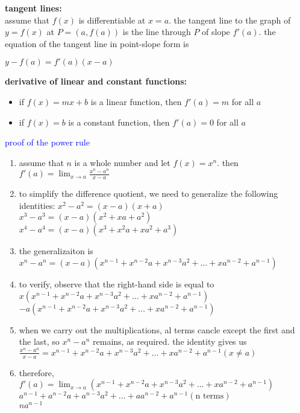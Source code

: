 \documentclass{article}
\begin{document}
\textbf{tangent lines:}\\
assume that $f(x)$ is differentiable at $x = a$. the tangent line to the graph of $y = f(x)$ at $P = (a, f(a))$ is the line through $P$ of slope $f'(a)$. the equation of the tangent line in point-slope form is
\begin{center} $y - f(a) = f'(a)(x - a)$ \end{center}

\textbf{derivative of linear and constant functions:}
	\begin{itemize}
		\item if $f(x) = mx + b$ is a linear function, then $f'(a) = m$ for all $a$
		\item if $f(x) = b$ is a constant function, then $f'(a) = 0$ for all $a$
	\end{itemize}
\newpage

\textcolor{blue}{proof of the power rule}
	\begin{enumerate}
		\item assume that $n$ is a whole number and let $f(x) = x^n$. then $f'(a) = \lim_{x \to a}\frac{x^n - a^n}{x - a}$
		\item to simplify the difference quotient, we need to generalize the following identities: $x^2 - a^2 = (x - a)(x + a)$\\ $x^3 - a^3 = (x - a)(x^2 + xa + a^2)$\\ $x^4 - a^4 = (x - a)(x^3 + x^2a + xa^2 + a^3)$
		\item the generalizaiton is $x^n - a^n = (x - a)(x^{n - 1} + x^{n - 2}a + x^{n - 3}a^2 + \ldots + xa^{n - 2} + a^{n - 1})$
		\item to verify, observe that the right-hand side is equal to\\ $x(x^{n - 1} + x^{n - 2}a + x^{n - 3}a^2 + \ldots + xa^{n - 2} + a^{n - 1})$\\$-a(x^{n - 1} + x^{n - 2}a + x^{n - 3}a^2 + \ldots + xa^{n - 2} + a^{n - 1})$
		\item when we carry out the multiplications, al terms cancle except the first and the last, so $x^n - a^n$ remains, as required. the identity gives us\\ $\frac{x^n - a^n}{x - a} = x^{n - 1} + x^{n - 2}a + x^{n - 3}a^2 + \ldots + xa^{n - 2} + a^{n - 1} (x \neq a)$
		\item therefore,\\ $f'(a) = \lim_{x \to a}(x^{n - 1} + x^{n - 2}a + x^{n - 3}a^2 + \ldots + xa^{n - 2} + a^{n - 1})$\\ $a^{n - 1} + a^{n - 2}a + a^{n - 3}a^2 + \ldots + aa^{n - 2} + a^{n - 1} (\text{n terms})$\\ $na^{n - 1}$
	\end{enumerate}
\end{document}
